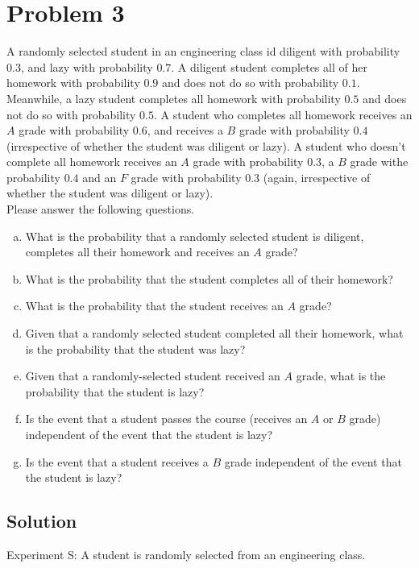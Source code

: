 \section{Problem 3}

A randomly selected student in an engineering class id diligent with probability $0.3$, and lazy with probability $0.7$. A diligent student completes all of her homework with probability $0.9$ and does not do so with probability $0.1$. Meanwhile, a lazy student completes all homework with probability $0.5$ and does not do so with probability $0.5$. A student who completes all homework receives an $A$ grade with probability $0.6$, and receives a $B$ grade with probability $0.4$ (irrespective of whether the student was diligent or lazy). A student who doesn't complete all homework receives an $A$ grade with probability $0.3$, a $B$ grade withe probability $0.4$ and an $F$ grade with probability $0.3$ (again, irrespective of whether the student was diligent or lazy).\\
Please answer the following questions.\\

\begin{enumerate}[a.]
	\item What is the probability that a randomly selected student is diligent, completes all their homework and receives an $A$ grade?
	\item What is the probability that the student completes all of their homework?
	\item What is the probability that the student receives an $A$ grade?
	\item Given that a randomly selected student completed all their homework, what is the probability that the student was lazy?
	\item Given that a randomly-selected student received an $A$ grade, what is the probability that the student is lazy?
	\item Is the event that a student passes the course (receives an $A$ or $B$ grade) independent of the event that the student is lazy?
	\item Is the event that a student receives a $B$ grade independent of the event that the student is lazy? 
\end{enumerate}

\subsection{Solution}

Experiment S: A student is randomly selected from an engineering class.


